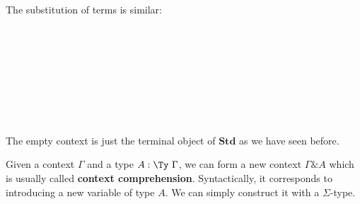 The substitution of terms is similar:

\begin{code}\>\<%
\\
\> \AgdaSymbol{:}  \AgdaSymbol{\{}  \AgdaSymbol{:} \AgdaSymbol{\}\{} \AgdaSymbol{:}  \AgdaSymbol{\}}    \<[39]%
\>[39]\<%
\\
\>[0]\<[6]%
\>[6] \AgdaSymbol{(} \AgdaSymbol{:}   \AgdaSymbol{)}   \AgdaSymbol{(} \AgdaFunction{[}  \AgdaFunction{]T}\AgdaSymbol{)}\<%
\\
\>   \AgdaSymbol{=}  \<[19]%
\>[19]\<%
\\
\>[0]\<[10]%
\>[10]\AgdaSymbol{\{}  \AgdaSymbol{=} \AgdaFunction{[}  \AgdaFunction{]tm}  \AgdaFunction{[}  \AgdaFunction{]fn}\<%
\\
\>[0]\<[10]%
\>[10]\AgdaSymbol{;}  \AgdaSymbol{=} \AgdaFunction{[}  \AgdaFunction{]respt}  \AgdaFunction{[}  \AgdaFunction{]resp} \<[43]%
\>[43]\<%
\\
\>[0]\<[10]%
\>[10]\AgdaSymbol{\}}\<%
\\
\>\<\end{code}

The empty context is just the terminal object of $\textbf{Std}$ as we have seen before.

Given a context $\Gamma$ and a type $A : \Ty ~\Gamma$, we can form a new context $\Gamma \& A$ which is usually called \textbf{context comprehension}. 
Syntactically, it corresponds to introducing a new variable of type $A$. 
We can simply construct it with a $\Sigma$-type.

